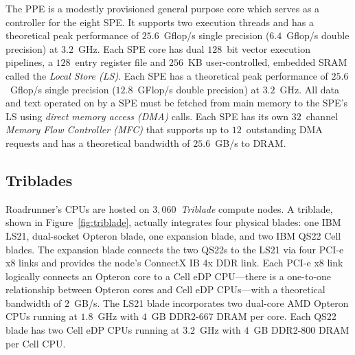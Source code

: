 \documentclass[journal,twoside]{IEEEtran}
\newcommand{\fig}[1]{Figure~\ref{fig:#1}}
\begin{document}
The PPE is a modestly provisioned general purpose core which serves as
a controller for the eight SPE.  It supports two execution threads and
has a theoretical peak performance of $25.6$~Gflop/s single precision
($6.4$~Gflop/s double precision) at $3.2$~GHz.  Each SPE core has dual
$128$~bit vector execution pipelines, a $128$~entry register file and
$256$~KB user-controlled, embedded SRAM called the \emph{Local Store
(LS)}.  Each SPE has a theoretical peak performance of $25.6$~Gflop/s
single precision ($12.8$~GFlop/s double precision) at $3.2$~GHz.  All
data and text operated on by a SPE must be fetched from main memory to
the SPE's LS using \emph{direct memory access (DMA)} calls.  Each SPE
has its own $32$~channel \emph{Memory Flow Controller (MFC)} that
supports up to $12$~outstanding DMA requests and has a theoretical
bandwidth of $25.6$~GB/s to DRAM.

\subsection{Triblades}

Roadrunner's CPUs are hosted on $3,060$~\emph{Triblade} compute nodes.
A triblade, shown in \fig{triblade}, actually integrates four physical
blades: one IBM LS21, dual-socket Opteron blade, one expansion blade,
and two IBM QS22 Cell blades.  The expansion blade connects the two
QS22s to the LS21 via four PCI-e x8 links and provides the node's
ConnectX IB 4x DDR link.  Each PCI-e x8 link logically connects an
Opteron core to a Cell eDP CPU---there is a one-to-one relationship
between Opteron cores and Cell eDP CPUs---with a theoretical bandwidth
of $2$~GB/s.  The LS21 blade incorporates two dual-core AMD Opteron
CPUs running at $1.8$~GHz with $4$~GB DDR2-667 DRAM per core.  Each
QS22 blade has two Cell eDP CPUs running at $3.2$~GHz with $4$~GB
DDR2-800 DRAM per Cell CPU.
\end{document}
